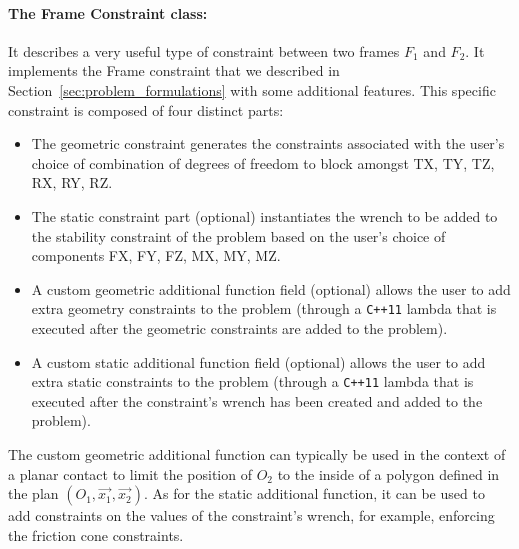 \paragraph{The Frame Constraint class:}
It describes a very useful type of constraint between two frames $F_1$ and $F_2$.
It implements the Frame constraint that we described in Section~\ref{sec:problem_formulations} with some additional features.
This specific constraint is composed of four distinct parts:
\begin{itemize}
  \item The geometric constraint generates the constraints associated with the user's choice of combination of degrees of freedom to block amongst TX, TY, TZ, RX, RY, RZ.
  \item The static constraint part (optional) instantiates the wrench to be added to the stability constraint of the problem based on the user's choice of components FX, FY, FZ, MX, MY, MZ.
  \item A custom geometric additional function field (optional) allows the user to add extra geometry constraints to the problem (through a \texttt{C++11} lambda that is executed after the geometric constraints are added to the problem).
  \item A custom static additional function field (optional) allows the user to add extra static constraints to the problem (through a \texttt{C++11} lambda that is executed after the constraint's wrench has been created and added to the problem).
\end{itemize}
The custom geometric additional function can typically be used in the context of a planar contact to limit the position of $O_2$ to the inside of a polygon defined in the plan $(O_1,\vec{x_1},\vec{x_2})$.
As for the static additional function, it can be used to add constraints on the values of the constraint's wrench, for example, enforcing the friction cone constraints.



